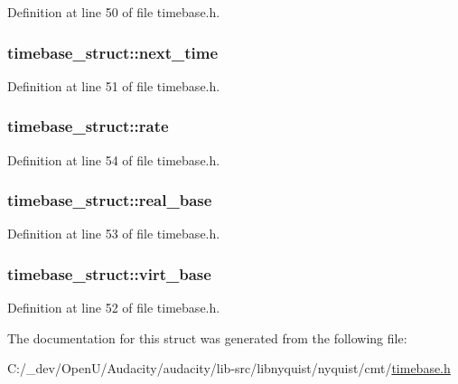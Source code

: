 Definition at line 50 of file timebase.\+h.

\subsubsection[{\texorpdfstring{next\+\_\+time}{next_time}}]{ timebase\+\_\+struct\+::next\+\_\+time}\hypertarget{structtimebase__struct_a8fcec62ba28a693e4b2629d330eaf56e}{}\label{structtimebase__struct_a8fcec62ba28a693e4b2629d330eaf56e}


Definition at line 51 of file timebase.\+h.

\subsubsection[{\texorpdfstring{rate}{rate}}]{ timebase\+\_\+struct\+::rate}\hypertarget{structtimebase__struct_a0b7fdc52e2a68a22aef8b948a207fd49}{}\label{structtimebase__struct_a0b7fdc52e2a68a22aef8b948a207fd49}


Definition at line 54 of file timebase.\+h.

\subsubsection[{\texorpdfstring{real\+\_\+base}{real_base}}]{ timebase\+\_\+struct\+::real\+\_\+base}\hypertarget{structtimebase__struct_a5430817b264d9280c43a71c1f53fa31e}{}\label{structtimebase__struct_a5430817b264d9280c43a71c1f53fa31e}


Definition at line 53 of file timebase.\+h.

\subsubsection[{\texorpdfstring{virt\+\_\+base}{virt_base}}]{ timebase\+\_\+struct\+::virt\+\_\+base}\hypertarget{structtimebase__struct_a35b158b60735ca665974f52b48b761f4}{}\label{structtimebase__struct_a35b158b60735ca665974f52b48b761f4}


Definition at line 52 of file timebase.\+h.



The documentation for this struct was generated from the following file\+:\begin{DoxyCompactItemize}
\item 
C\+:/\+\_\+dev/\+Open\+U/\+Audacity/audacity/lib-\/src/libnyquist/nyquist/cmt/\hyperlink{timebase_8h}{timebase.\+h}\end{DoxyCompactItemize}
